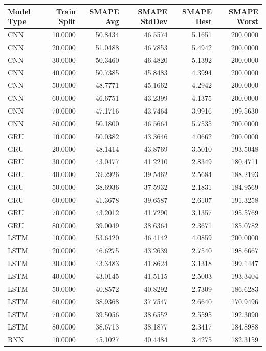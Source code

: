 \begin{tabular}{lrrrrr}
\toprule
Model Type & Train Split & SMAPE Avg & SMAPE StdDev & SMAPE Best & SMAPE Worst \\
\midrule
CNN & 10.0000 & 50.8434 & 46.5574 & 5.1651 & 200.0000 \\
CNN & 20.0000 & 51.0488 & 46.7853 & 5.4942 & 200.0000 \\
CNN & 30.0000 & 50.3460 & 46.4820 & 5.1392 & 200.0000 \\
CNN & 40.0000 & 50.7385 & 45.8483 & 4.3994 & 200.0000 \\
CNN & 50.0000 & 48.7771 & 45.1662 & 4.2942 & 200.0000 \\
CNN & 60.0000 & 46.6751 & 43.2399 & 4.1375 & 200.0000 \\
CNN & 70.0000 & 47.1716 & 43.7464 & 3.9916 & 199.5630 \\
CNN & 80.0000 & 50.1800 & 46.5664 & 5.7535 & 200.0000 \\
GRU & 10.0000 & 50.0382 & 43.3646 & 4.0662 & 200.0000 \\
GRU & 20.0000 & 48.1414 & 43.8769 & 3.5010 & 193.5048 \\
GRU & 30.0000 & 43.0477 & 41.2210 & 2.8349 & 180.4711 \\
GRU & 40.0000 & 39.2926 & 39.5462 & 2.5684 & 188.2193 \\
GRU & 50.0000 & 38.6936 & 37.5932 & 2.1831 & 184.9569 \\
GRU & 60.0000 & 41.3678 & 39.6587 & 2.6107 & 191.3258 \\
GRU & 70.0000 & 43.2012 & 41.7290 & 3.1357 & 195.5769 \\
GRU & 80.0000 & 39.0049 & 38.6364 & 2.3671 & 185.0782 \\
LSTM & 10.0000 & 53.6420 & 46.4142 & 4.0859 & 200.0000 \\
LSTM & 20.0000 & 46.6275 & 43.2639 & 2.7540 & 198.6667 \\
LSTM & 30.0000 & 43.3483 & 41.8624 & 3.1318 & 199.1447 \\
LSTM & 40.0000 & 43.0145 & 41.5115 & 2.5003 & 193.3404 \\
LSTM & 50.0000 & 40.8572 & 40.8292 & 2.7309 & 186.6283 \\
LSTM & 60.0000 & 38.9368 & 37.7547 & 2.6640 & 170.9496 \\
LSTM & 70.0000 & 39.5056 & 38.6552 & 2.5595 & 192.3090 \\
LSTM & 80.0000 & 38.6713 & 38.1877 & 2.3417 & 184.8988 \\
RNN & 10.0000 & 45.1027 & 40.4484 & 3.4275 & 182.3159 \\

\end{tabular}

